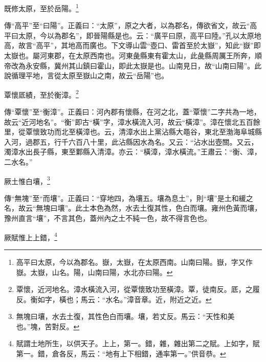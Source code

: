 既修太原，至於岳陽。\footnote{高平曰太原，今以為郡名。嶽，太嶽，在太原西南。山南曰陽。嶽，字又作嶽。太嶽，山名。陽，山南曰陽，水北亦曰陽。}

{\noindent\zhuan{}\fzbyks 傳“高平”至“曰陽”。正義曰：“太原”，原之大者，以為郡名，傳欲省文，故云“高平曰太原，今以為郡名”，即晉陽縣是也。云：“廣平曰原，高平曰陸。”孔以太原地高，故言“高平”，其地高而廣也。下文導山雲“壺口、雷首至於太嶽”，知此“嶽”即太嶽也。屬河東郡，在太原西南也。河東彘縣東有霍太山，此彘縣周厲王所奔，順帝改為永安縣，冀州其山鎮曰霍山，即此太嶽是也。山南見日，故“山南曰陽”。此說循理平地，言從太原至嶽山之南，故云“岳陽”也。 \par}

覃懷厎績，至於衡漳。\footnote{覃懷，近河地名。漳水橫流入河，從覃懷致功至橫漳。覃，徒南反。厎，之履反。衡如字，橫也；馬云：“水名。”漳音章。近，附近之近。}

{\noindent\zhuan{}\fzbyks 傳“覃懷”至“衡漳”。正義曰：河內郡有懷縣，在河之北，蓋“覃懷”二字共為一地，故云“近河地名”。“衡”即古“橫”字，漳水橫流入河，故云“橫漳”。漳在懷北五百餘里，從覃懷致功而北至橫漳也。云，清漳水出上黨沾縣大黽谷，東北至渤海阜城縣入河，過郡五，行千六百八十里，此沾縣因水為名。又云：“沾水出壺關。又云，濁漳水出長子縣，東至鄴縣入清漳。亦云：“橫漳，漳水橫流。”王肅云：“衡、漳，二水名。” \par}

厥土惟白壤，\footnote{無塊曰壤，水去土復，其性色白而壤。壤，若丈反。馬云：“天性和美也。”塊，苦對反。}

{\noindent\zhuan{}\fzbyks 傳“無塊”至“而壤”。正義曰：“穿地四，為壤五。壤為息土”，則“壤”是土和緩之名，故云“無塊曰壤”。此土本色為然，水去土復其性，色白而壤。雍州色黃而壤，豫州直言“壤”，不言其色，蓋州內之土不純一色，故不得言色也。 \par}

厥賦惟上上錯，\footnote{賦謂土地所生，以供天子。上上，第一。錯，雜，雜出第二之賦。上如字，賦第一。錯，倉各反，馬云：“地有上下相錯，通率第一。”供音恭。}

